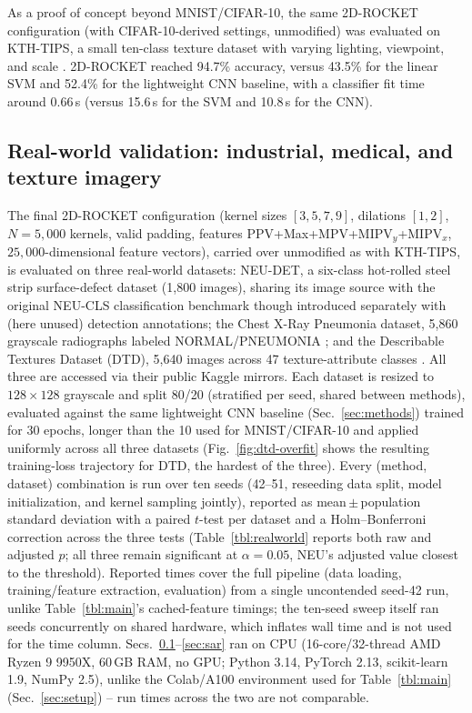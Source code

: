 \documentclass[a4paper,fleqn]{cas-sc}
\begin{document}
As a proof of concept beyond MNIST/CIFAR-10, the same 2D-ROCKET configuration (with CIFAR-10-derived settings, unmodified) was evaluated on KTH-TIPS, a small ten-class texture dataset with varying lighting, viewpoint, and scale \citep{grauman2004kth}. 2D-ROCKET reached 94.7\% accuracy, versus 43.5\% for the linear SVM and 52.4\% for the lightweight CNN baseline, with a classifier fit time around 0.66\,s (versus 15.6\,s for the SVM and 10.8\,s for the CNN).

\subsection{Real-world validation: industrial, medical, and texture imagery}\label{sec:realworld}

The final 2D-ROCKET configuration (kernel sizes $[3,5,7,9]$, dilations $[1,2]$, $N=5{,}000$ kernels, valid padding, features PPV+Max+MPV+MIPV$_y$+MIPV$_x$, $25{,}000$-dimensional feature vectors), carried over unmodified as with KTH-TIPS, is evaluated on three real-world datasets: NEU-DET, a six-class hot-rolled steel strip surface-defect dataset (1{,}800 images), sharing its image source with the original NEU-CLS classification benchmark \citep{song2013neu} though introduced separately with (here unused) detection annotations; the Chest X-Ray Pneumonia dataset, 5{,}860 grayscale radiographs labeled NORMAL/PNEUMONIA \citep{kermany2018identifying}; and the Describable Textures Dataset (DTD), 5{,}640 images across 47 texture-attribute classes \citep{cimpoi2014describing}. All three are accessed via their public Kaggle mirrors. Each dataset is resized to $128\times128$ grayscale and split 80/20 (stratified per seed, shared between methods), evaluated against the same lightweight CNN baseline (Sec.~\ref{sec:methods}) trained for 30 epochs, longer than the 10 used for MNIST/CIFAR-10 and applied uniformly across all three datasets (Fig.~\ref{fig:dtd-overfit} shows the resulting training-loss trajectory for DTD, the hardest of the three). Every (method, dataset) combination is run over ten seeds (42--51, reseeding data split, model initialization, and kernel sampling jointly), reported as mean\,$\pm$\,population standard deviation with a paired $t$-test per dataset and a Holm--Bonferroni correction across the three tests (Table~\ref{tbl:realworld} reports both raw and adjusted $p$; all three remain significant at $\alpha=0.05$, NEU's adjusted value closest to the threshold). Reported times cover the full pipeline (data loading, training/feature extraction, evaluation) from a single uncontended seed-42 run, unlike Table~\ref{tbl:main}'s cached-feature timings; the ten-seed sweep itself ran seeds concurrently on shared hardware, which inflates wall time and is not used for the time column. Secs.~\ref{sec:realworld}--\ref{sec:sar} ran on CPU (16-core/32-thread AMD Ryzen 9 9950X, 60\,GB RAM, no GPU; Python 3.14, PyTorch 2.13, scikit-learn 1.9, NumPy 2.5), unlike the Colab/A100 environment used for Table~\ref{tbl:main} (Sec.~\ref{sec:setup}) -- run times across the two are not comparable.
\end{document}
